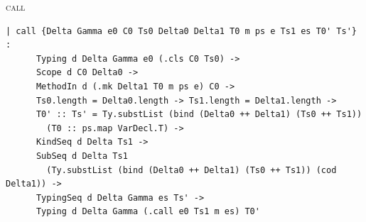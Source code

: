 \begin{cmp}{\textsc{call}}
\begin{paperside}
\end{paperside}
\begin{leanside}
\begin{lstlisting}[style=leanside]
  | call {Delta Gamma e0 C0 Ts0 Delta0 Delta1 T0 m ps e Ts1 es T0' Ts'} :
      Typing d Delta Gamma e0 (.cls C0 Ts0) ->
      Scope d C0 Delta0 ->
      MethodIn d (.mk Delta1 T0 m ps e) C0 ->
      Ts0.length = Delta0.length -> Ts1.length = Delta1.length ->
      T0' :: Ts' = Ty.substList (bind (Delta0 ++ Delta1) (Ts0 ++ Ts1))
        (T0 :: ps.map VarDecl.T) ->
      KindSeq d Delta Ts1 ->
      SubSeq d Delta Ts1
        (Ty.substList (bind (Delta0 ++ Delta1) (Ts0 ++ Ts1)) (cod Delta1)) ->
      TypingSeq d Delta Gamma es Ts' ->
      Typing d Delta Gamma (.call e0 Ts1 m es) T0'
\end{lstlisting}
\end{leanside}
\end{cmp}

